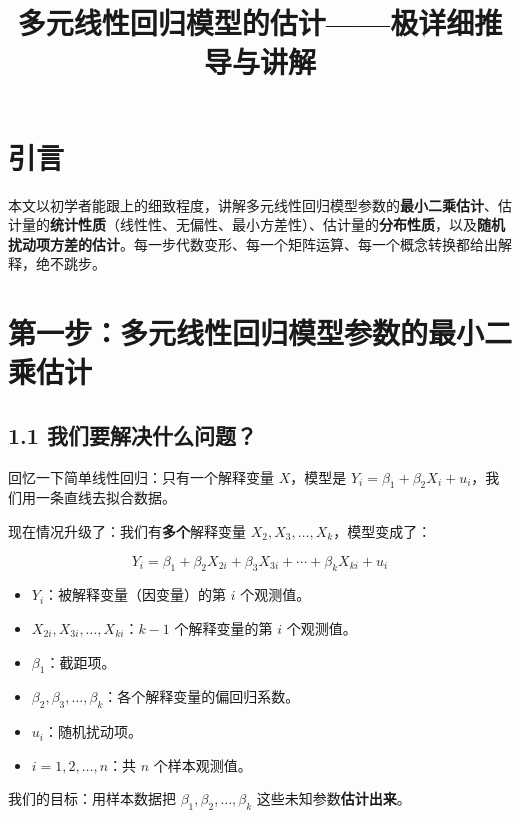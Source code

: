 \documentclass[12pt,a4paper]{ctexart}
\begin{document}
\title{\vspace{-2cm}多元线性回归模型的估计——极详细推导与讲解}
\author{}
\date{}
\maketitle

\section{引言}

本文以初学者能跟上的细致程度，讲解多元线性回归模型参数的\textbf{最小二乘估计}、估计量的\textbf{统计性质}（线性性、无偏性、最小方差性）、估计量的\textbf{分布性质}，以及\textbf{随机扰动项方差的估计}。每一步代数变形、每一个矩阵运算、每一个概念转换都给出解释，绝不跳步。

\section{第一步：多元线性回归模型参数的最小二乘估计}

\subsection{1.1 我们要解决什么问题？}

回忆一下简单线性回归：只有一个解释变量 $X$，模型是 $Y_i = \beta_1 + \beta_2 X_i + u_i$，我们用一条直线去拟合数据。

现在情况升级了：我们有\textbf{多个}解释变量 $X_2, X_3, \ldots, X_k$，模型变成了：

\[
Y_i = \beta_1 + \beta_2 X_{2i} + \beta_3 X_{3i} + \cdots + \beta_k X_{ki} + u_i
\]

\begin{itemize}
    \item $Y_i$：被解释变量（因变量）的第 $i$ 个观测值。
    \item $X_{2i}, X_{3i}, \ldots, X_{ki}$：$k-1$ 个解释变量的第 $i$ 个观测值。
    \item $\beta_1$：截距项。
    \item $\beta_2, \beta_3, \ldots, \beta_k$：各个解释变量的偏回归系数。
    \item $u_i$：随机扰动项。
    \item $i = 1, 2, \ldots, n$：共 $n$ 个样本观测值。
\end{itemize}

我们的目标：用样本数据把 $\beta_1, \beta_2, \ldots, \beta_k$ 这些未知参数\textbf{估计出来}。
\end{document}
